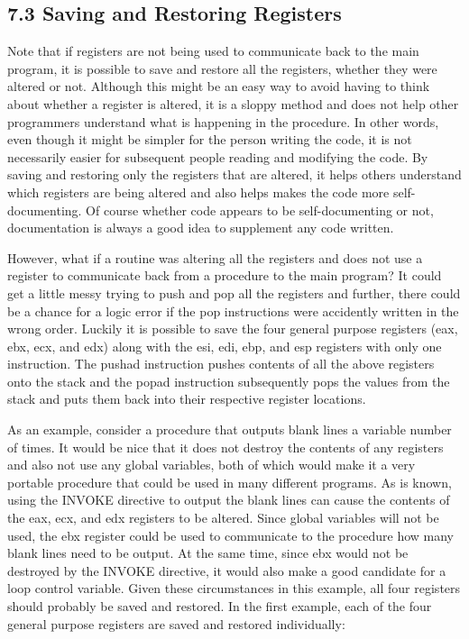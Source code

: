 \documentclass[10pt]{article}
\begin{document}
\subsection*{7.3 Saving and Restoring Registers}
Note that if registers are not being used to communicate back to the main program, it is possible to save and restore all the registers, whether they were altered or not. Although this might be an easy way to avoid having to think about whether a register is altered, it is a sloppy method and does not help other programmers understand what is happening in the procedure. In other words, even though it might be simpler for the person writing the code, it is not necessarily easier for subsequent people reading and modifying the code. By saving and restoring only the registers that are altered, it helps others understand which registers are being altered and also helps makes the code more self-documenting. Of course whether code appears to be self-documenting or not, documentation is always a good idea to supplement any code written.

However, what if a routine was altering all the registers and does not use a register to communicate back from a procedure to the main program? It could get a little messy trying to push and pop all the registers and further, there could be a chance for a logic error if the pop instructions were accidently written in the wrong order. Luckily it is possible to save the four general purpose registers (eax, ebx, ecx, and edx) along with the esi, edi, ebp, and esp registers with only one instruction. The pushad instruction pushes contents of all the above registers onto the stack and the popad instruction subsequently pops the values from the stack and puts them back into their respective register locations.

As an example, consider a procedure that outputs blank lines a variable number of times. It would be nice that it does not destroy the contents of any registers and also not use any global variables, both of which would make it a very portable procedure that could be used in many different programs. As is known, using the INVOKE directive to output the blank lines can cause the contents of the eax, ecx, and edx registers to be altered. Since global variables will not be used, the ebx register could be used to communicate to the procedure how many blank lines need to be output. At the same time, since ebx would not be destroyed by the INVOKE directive, it would also make a good candidate for a loop control variable. Given these circumstances in this example, all four registers should probably be saved and restored. In the first example, each of the four general purpose registers are saved and restored individually:
\end{document}
